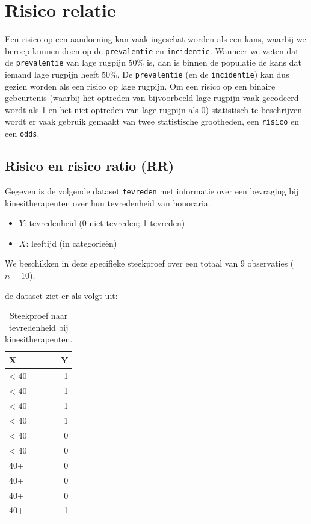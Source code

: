 \documentclass[
]{book}
\providecommand{\tightlist}{%
  \setlength{\itemsep}{0pt}\setlength{\parskip}{0pt}}
\theoremstyle{definition}
\theoremstyle{definition}
\theoremstyle{definition}
\theoremstyle{definition}
\theoremstyle{remark}
\begin{document}
\hypertarget{risico-relatie}{%
\section*{Risico relatie}\label{risico-relatie}}


Een risico op een aandoening kan vaak ingeschat worden als een kans, waarbij we beroep kunnen doen op de \texttt{prevalentie} en \texttt{incidentie}. Wanneer we weten dat de \texttt{prevalentie} van lage rugpijn 50\% is, dan is binnen de populatie de kans dat iemand lage rugpijn heeft 50\%. De \texttt{prevalentie} (en de \texttt{incidentie}) kan dus gezien worden als een risico op lage rugpijn. Om een risico op een binaire gebeurtenis (waarbij het optreden van bijvoorbeeld lage rugpijn vaak gecodeerd wordt als 1 en het niet optreden van lage rugpijn als 0) statistisch te beschrijven wordt er vaak gebruik gemaakt van twee statistische grootheden, een \texttt{risico} en een \texttt{odds}.

\hypertarget{risico-en-risico-ratio-rr}{%
\subsection*{Risico en risico ratio (RR)}\label{risico-en-risico-ratio-rr}}


Gegeven is de volgende dataset \texttt{tevreden} met informatie over een bevraging bij kinesitherapeuten over hun tevredenheid van honoraria.

\begin{itemize}
\tightlist
\item
  \(Y\): tevredenheid (0-niet tevreden; 1-tevreden)
\item
  \(X\): leeftijd (in categorieën)
\end{itemize}

We beschikken in deze specifieke steekproef over een totaal van 9 observaties (\(n = 10\)).

de dataset ziet er als volgt uit:

\begin{table}

\caption{\label{tab:tevereden3}Steekproef naar tevredenheid bij kinesitherapeuten.}
\centering
\begin{tabular}[t]{lr}
\toprule
X & Y\\
\midrule
< 40 & 1\\
< 40 & 1\\
< 40 & 1\\
< 40 & 1\\
< 40 & 0\\
\addlinespace
< 40 & 0\\
40+ & 0\\
40+ & 0\\
40+ & 0\\
40+ & 1\\
\bottomrule
\end{tabular}
\end{table}
\end{document}
